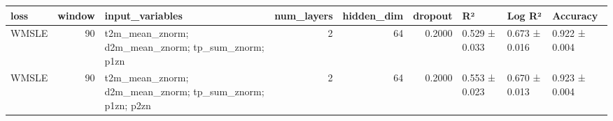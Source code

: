 \begin{tabular}{lrlrrrlll}
\toprule
loss & window & input\_variables & num\_layers & hidden\_dim & dropout & R² & Log R² & Accuracy \\
\midrule
WMSLE & 90 & t2m\_mean\_znorm; d2m\_mean\_znorm; tp\_sum\_znorm; p1zn & 2 & 64 & 0.2000 & 0.529 ± 0.033 & 0.673 ± 0.016 & 0.922 ± 0.004 \\
WMSLE & 90 & t2m\_mean\_znorm; d2m\_mean\_znorm; tp\_sum\_znorm; p1zn; p2zn & 2 & 64 & 0.2000 & 0.553 ± 0.023 & 0.670 ± 0.013 & 0.923 ± 0.004 \\
\bottomrule
\end{tabular}
